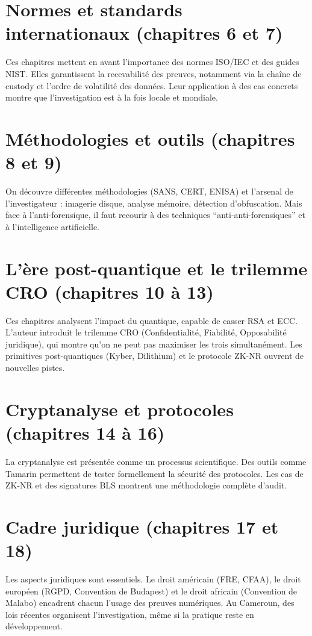 \documentclass[12pt,a4paper]{report}
\begin{document}
	\section*{Normes et standards internationaux (chapitres 6 et 7)}
	Ces chapitres mettent en avant l’importance des normes ISO/IEC et des guides NIST. 
	Elles garantissent la recevabilité des preuves, notamment via la chaîne de custody 
	et l’ordre de volatilité des données. 
	Leur application à des cas concrets montre que l’investigation est à la fois locale et mondiale.  
	
	\section*{Méthodologies et outils (chapitres 8 et 9)}
	On découvre différentes méthodologies (SANS, CERT, ENISA) et l’arsenal de l’investigateur : 
	imagerie disque, analyse mémoire, détection d’obfuscation. 
	Mais face à l’anti-forensique, il faut recourir à des techniques “anti-anti-forensiques” 
	et à l’intelligence artificielle.  
	
	\section*{L’ère post-quantique et le trilemme CRO (chapitres 10 à 13)}
	Ces chapitres analysent l’impact du quantique, capable de casser RSA et ECC. 
	L’auteur introduit le trilemme CRO (Confidentialité, Fiabilité, Opposabilité juridique), 
	qui montre qu’on ne peut pas maximiser les trois simultanément. 
	Les primitives post-quantiques (Kyber, Dilithium) et le protocole ZK-NR ouvrent de nouvelles pistes.  
	
	\section*{Cryptanalyse et protocoles (chapitres 14 à 16)}
	La cryptanalyse est présentée comme un processus scientifique. 
	Des outils comme Tamarin permettent de tester formellement la sécurité des protocoles. 
	Les cas de ZK-NR et des signatures BLS montrent une méthodologie complète d’audit.  
	
	\section*{Cadre juridique (chapitres 17 et 18)}
	Les aspects juridiques sont essentiels. 
	Le droit américain (FRE, CFAA), le droit européen (RGPD, Convention de Budapest) 
	et le droit africain (Convention de Malabo) encadrent chacun l’usage des preuves numériques. 
	Au Cameroun, des lois récentes organisent l’investigation, même si la pratique reste en développement.  
	
\end{document}
